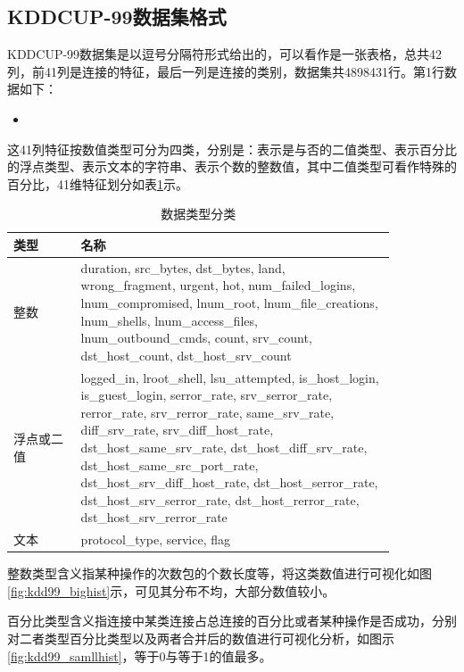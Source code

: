 \subsection{KDDCUP-99数据集格式}
KDDCUP-99数据集是以逗号分隔符形式给出的，可以看作是一张表格，总共42列，前41列是连接的特征，最后一列是连接的类别，数据集共4898431行。第1行数据如下：
\begin{itemize}
\item {}
\end{itemize}
这41列特征按数值类型可分为四类，分别是：表示是与否的二值类型、表示百分比的浮点类型、表示文本的字符串、表示个数的整数值，其中二值类型可看作特殊的百分比，41维特征划分如表\ref{table:kdd_feature_types}示。

\begin{table}[htbp]
\centering
\caption{数据类型分类}
\begin{tabular}{p{0.15\linewidth}p{0.7\linewidth}}
\toprule
\textbf{类型} & \textbf{名称} \\
\midrule
整数 & duration, src\_bytes, dst\_bytes, land, wrong\_fragment, urgent, hot, num\_failed\_logins, lnum\_compromised, lnum\_root, lnum\_file\_creations, lnum\_shells, lnum\_access\_files, lnum\_outbound\_cmds, count, srv\_count, dst\_host\_count, dst\_host\_srv\_count \\
\addlinespace
浮点或二值 & logged\_in, lroot\_shell, lsu\_attempted, is\_host\_login, is\_guest\_login, serror\_rate, srv\_serror\_rate, rerror\_rate, srv\_rerror\_rate, same\_srv\_rate, diff\_srv\_rate, srv\_diff\_host\_rate, dst\_host\_same\_srv\_rate, dst\_host\_diff\_srv\_rate, dst\_host\_same\_src\_port\_rate, dst\_host\_srv\_diff\_host\_rate, dst\_host\_serror\_rate, dst\_host\_srv\_serror\_rate, dst\_host\_rerror\_rate, dst\_host\_srv\_rerror\_rate \\
\addlinespace
文本 & protocol\_type, service, flag \\
\bottomrule
\end{tabular}
\label{table:kdd_feature_types}
\end{table}

整数类型含义指某种操作的次数包的个数长度等，将这类数值进行可视化如图\ref{fig:kdd99_bighist}示，可见其分布不均，大部分数值较小。

百分比类型含义指连接中某类连接占总连接的百分比或者某种操作是否成功，分别对二者类型百分比类型以及两者合并后的数值进行可视化分析，如图示\ref{fig:kdd99_samllhist}，等于0与等于1的值最多。

